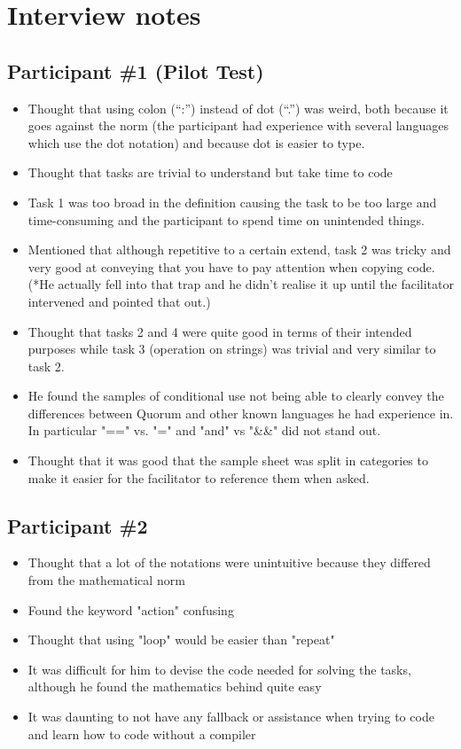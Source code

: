 \chapter{Interview notes}
\section{Participant {\#}1 (Pilot Test)}
\begin{itemize}
\item Thought that using colon (“:”) instead of dot (“.”) was weird, both because it goes against the norm (the participant had experience with several languages which use the dot notation) and because dot is easier to type. 
\item Thought that tasks are trivial to understand but take time to code
\item Task 1 was too broad in the definition causing the task to be too large and time-consuming and the participant to spend time on unintended things.
\item Mentioned that although repetitive to a certain extend, task 2 was tricky and very good at conveying that you have to pay attention when copying code. 
(*He actually fell into that trap and he didn’t realise it up until the facilitator intervened and pointed that out.) 
\item Thought that tasks 2 and 4 were quite good in terms of their intended purposes while task 3 (operation on strings) was trivial and very similar to task 2. 
\item He found the samples of conditional use not being able to clearly convey the differences between Quorum and other known languages he had experience in. In particular "==" vs. "=" and "and" vs "\&\&" did not stand out.
\item Thought that it was good that the sample sheet was split in categories to make it easier for the facilitator to reference them when asked.
\end{itemize}
\section{Participant {\#}2}
\begin{itemize}
\item Thought that a lot of the notations were unintuitive because they differed from the mathematical norm
\item Found the keyword "action" confusing 
\item Thought that using "loop" would be easier than "repeat"
\item It was difficult for him to devise the code needed for solving the tasks, although he found the mathematics behind quite easy
\item It was daunting to not have any fallback or assistance when trying to code and learn how to code without a compiler
\end{itemize}
